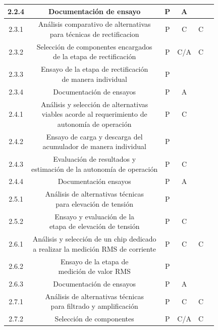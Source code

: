 \documentclass[11pt]{charter}
\begin{document}
\begin{table}[H]
{\begin{tabular}{|c|c|c|c|c|c|}
 2.2.4& Documentación de ensayo & P & A &  &  \\ \hline
 2.3.1& \shortstack{Análisis comparativo de alternativas\\para técnicas de rectificacion} & P & C & C &  \\ \hline
 2.3.2& \shortstack{Selección de componentes encargados\\de la etapa de rectificación} & P & C/A & C &  \\ \hline
 2.3.3& \shortstack{Ensayo de la etapa de rectificación\\de manera individual}& P &  &  &  \\ \hline
 2.3.4& Documentación de ensayos & P & A &  &  \\ \hline
 2.4.1& \shortstack{Análisis y selección de alternativas\\viables acorde al requerimiento de\\autonomía de operación} & P & C &  &  \\ \hline
 2.4.2& \shortstack{Ensayo de carga y descarga del\\acumulador de manera individual}& P &  &  &  \\ \hline
 2.4.3& \shortstack{Evaluación de resultados y\\estimación de la autonomía de operación}& P & C &  &  \\ \hline
 2.4.4& Documentación ensayos & P & A &  &  \\ \hline
 2.5.1& \shortstack{Análisis de alternativas técnicas\\para elevación de tensión}& P &  &  &  \\ \hline
 2.5.2& \shortstack{Ensayo y evaluación de la\\etapa de elevación de tensión}& P & C &  &  \\ \hline
 2.6.1& \shortstack{Análisis y selección de un chip dedicado\\a realizar la medición RMS de corriente} & P & C & C &  \\ \hline
 2.6.2& \shortstack{Ensayo de la etapa de\\medición de valor RMS}& P &  &  &  \\ \hline
 2.6.3& Documentación de ensayos & P & A &  &  \\ \hline
 2.7.1& \shortstack{Análisis de alternativas técnicas\\para filtrado y amplificación} & P & C & C &  \\ \hline
 2.7.2& Selección de componentes & P & C/A & C &  \\ \hline

\end{tabular}}
\end{table}
\end{document}
